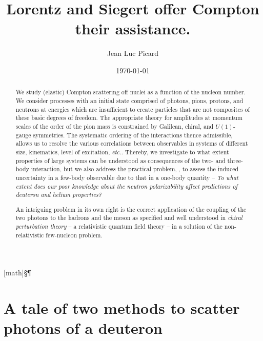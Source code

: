 [math]{\dagger\ddagger\S\P\|{\dagger\dagger}{\ddagger\ddagger}}
\renewcommand\thefootnote{\fnsymbol{footnote}}
\let\endtitlepage\relax



\title{Lorentz and Siegert offer Compton their assistance.}
\author{Jean Luc Picard}
\date{\today}

\begin{abstract}
We study (elastic) Compton scattering off nuclei as a function of the
nucleon number. We consider processes with an initial state comprised of
photons, pions, protons, and neutrons at energies which are insufficient to
create particles that are not composites of these basic degrees of freedom.
The appropriate theory for amplitudes at momentum scales of the order of the pion mass
is constrained by Galilean, chiral, and $U(1)$-gauge symmetries.
The systematic ordering of the interactions thence admissible, allows us to
resolve the various correlations between observables in systems of different
size, kinematics, level of excitation, {\it etc.}. Thereby, we investigate to what
extent properties of large systems can be understood as consequences of the
two- and three-body interaction, but we also address the practical problem, \eg,
to assess the induced uncertainty in a few-body observable due to that in a
one-body quantity -- {\it To what extent does our poor knowledge about the neutron
polarizability affect predictions of deuteron and helium properties?}

An intriguing problem in its own right is the correct application of the
coupling of the two photons to the hadrons and the meson as specified and well
understood in {\it chiral perturbation theory} -- a relativistic quantum field theory --
in a solution of the non-relativistic few-nucleon problem.
\end{abstract}



\section{A tale of two methods to scatter photons of a deuteron}

